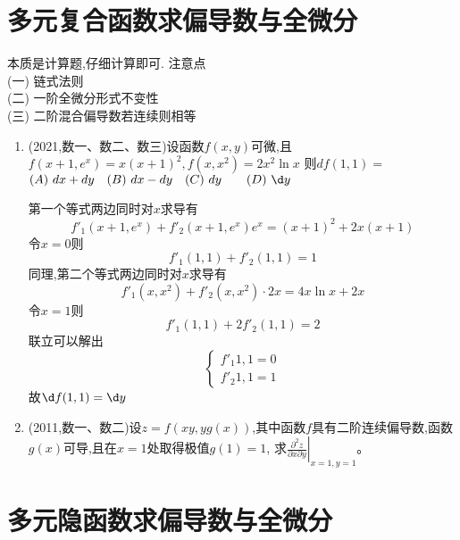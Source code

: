\documentclass[12pt, a4paper, oneside, UTF8]{ctexbook}
\begin{document}
\section{多元复合函数求偏导数与全微分}

\begin{remark}
    本质是计算题,仔细计算即可. 注意点 \\
    (一) 链式法则 \\
    (二) 一阶全微分形式不变性 \\
    (三) 二阶混合偏导数若连续则相等 
\end{remark}

\begin{enumerate}[label=\arabic*.,start=4]
    \item (2021,数一、数二、数三)设函数$f(x,y)$可微,且$f(x+1,e^x)=x(x+1)^2,f(x,x^2)=2x^2\ln x$
    则$df(1,1)=$ \\
    $(A)\ dx+dy \quad (B)\ dx-dy \quad (C)\ dy\qquad (D)\ \d y$
    
    \begin{solution}
    第一个等式两边同时对$x$求导有
    $$
    f'_1(x+1,e^x)+f'_2(x+1,e^x)e^x=(x+1)^2+2x(x+1)
    $$
    令$x=0$则
    $$
    f'_1(1,1)+f'_2(1,1)=1
    $$
    同理,第二个等式两边同时对$x$求导有
    $$
    f'_1(x,x^2)+f'_2(x,x^2)\cdot 2x = 4x\ln{x}+2x 
    $$
    令$x=1$则
    $$
    f'_1(1,1)+2f'_2(1,1)=2
    $$
    联立可以解出
    $$
    \begin{cases}
        f'_1{1,1}=0 \\
        f'_2{1,1}=1
    \end{cases}
    $$
    故$\d f(1,1)=\d y$
    \end{solution}
    
    \item (2011,数一、数二)设$z=f(xy,yg(x))$,其中函数$f$具有二阶连续偏导数,函数$g(x)$可导,且在$x=1$处取得极值$g(1)=1$,
    求$\displaystyle\left.\frac{\partial^2 z}{\partial x\partial y}\right|_{x=1,y=1}$。
    
    \begin{solution}
    \newpage
    \end{solution}
\end{enumerate}

\section{多元隐函数求偏导数与全微分}
\end{document}
